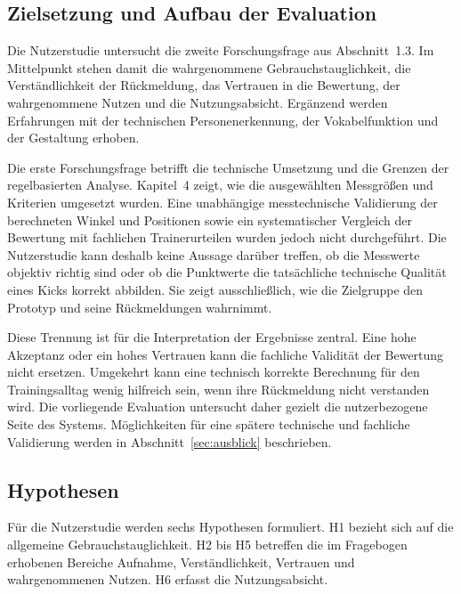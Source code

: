 \documentclass[intern]{cgMA}
\begin{document}
\subsection{Zielsetzung und Aufbau der Evaluation}
\label{sec:eval_ziel}
Die Nutzerstudie untersucht die zweite Forschungsfrage aus Abschnitt~1.3. Im Mittelpunkt stehen damit die wahrgenommene Gebrauchstauglichkeit, die Verständlichkeit der Rückmeldung, das Vertrauen in die Bewertung, der wahrgenommene Nutzen und die Nutzungsabsicht. Ergänzend werden Erfahrungen mit der technischen Personenerkennung, der Vokabelfunktion und der Gestaltung erhoben.

Die erste Forschungsfrage betrifft die technische Umsetzung und die Grenzen der regelbasierten Analyse. Kapitel~4 zeigt, wie die ausgewählten Messgrößen und Kriterien umgesetzt wurden. Eine unabhängige messtechnische Validierung der berechneten Winkel und Positionen sowie ein systematischer Vergleich der Bewertung mit fachlichen Trainerurteilen wurden jedoch nicht durchgeführt. Die Nutzerstudie kann deshalb keine Aussage darüber treffen, ob die Messwerte objektiv richtig sind oder ob die Punktwerte die tatsächliche technische Qualität eines Kicks korrekt abbilden. Sie zeigt ausschließlich, wie die Zielgruppe den Prototyp und seine Rückmeldungen wahrnimmt.

Diese Trennung ist für die Interpretation der Ergebnisse zentral. Eine hohe Akzeptanz oder ein hohes Vertrauen kann die fachliche Validität der Bewertung nicht ersetzen. Umgekehrt kann eine technisch korrekte Berechnung für den Trainingsalltag wenig hilfreich sein, wenn ihre Rückmeldung nicht verstanden wird. Die vorliegende Evaluation untersucht daher gezielt die nutzerbezogene Seite des Systems. Möglichkeiten für eine spätere technische und fachliche Validierung werden in Abschnitt~\ref{sec:ausblick} beschrieben.

\subsection{Hypothesen}
\label{sec:eval_hyp}
Für die Nutzerstudie werden sechs Hypothesen formuliert. H1 bezieht sich auf die allgemeine Gebrauchstauglichkeit. H2 bis H5 betreffen die im Fragebogen erhobenen Bereiche Aufnahme, Verständlichkeit, Vertrauen und wahrgenommenen Nutzen. H6 erfasst die Nutzungsabsicht.
\end{document}
